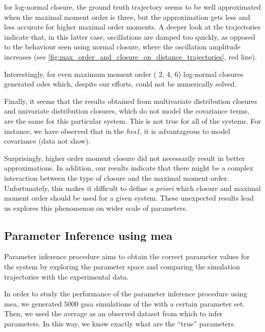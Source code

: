  
for log-normal closure, the ground truth trajectory seems to be well approximated when the maximal moment order is three, but the approximation gets less and less accurate for higher maximal order moments.
A deeper look at the trajectories indicate that, in this latter case,
oscillations are damped too quickly, as opposed to the behaviour seen using normal closure, where the oscillation amplitude increases (see \autoref{fig:max_order_and_closure_on_distance_trajectories}, red line).

Interestingly, for even maximum moment order (\ie{} 2, 4, 6) log-normal closures generated \gls{ode}s which, despite our efforts, could not be numerically solved.

Finally, it seems that the results obtained from multivariate distribution closures and  univariate distribution closures, which do not model the covariance terms, are the same for this particular system. 
This is not true for all of the systems. 
For instance, we have observed that in the \emph{hes1}, it is advantageous to model covariance (data not show).

Surprisingly, higher order moment closure did not necessarily result in better approximations.
In addition, our results indicate that there might be a complex interaction between the type of closure and the maximal moment order. 
Unfortunately, this makes it difficult to define \emph{a priori} which closure and maximal moment order should be used for a given system.
These unexpected results lead us explores this phenomenon on wider scale of parameters.

\subsection{Parameter Inference using \acrlong{mea}}
Parameter inference procedure aims to obtain the correct parameter values for the system by exploring the parameter space and comparing the simulation trajectories with the experimental data.

In order to study the performance of the parameter inference procedure using \acrlong{mea},
we generated $5000$ \gls{gssa} simulations of the \pft{} with a certain parameter set.
Then, we used the average as an observed dataset from which to infer parameters.
In this way, we know exactly what are the ``true'' parameters.

